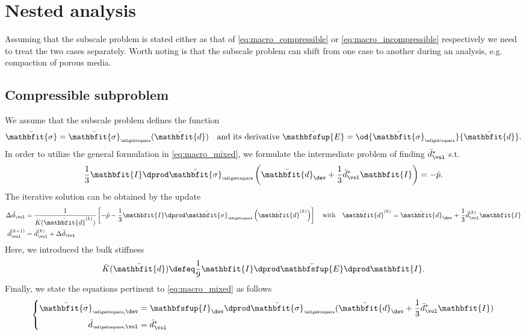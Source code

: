 \documentclass[a4paper,11pt]{article}
\renewcommand{\ts}[1]{\mathbfit{#1}}
\renewcommand{\tf}[1]{\mathbfsfup{#1}}
\renewcommand{\Box}{{\scalebox{0.5}{\mdlgwhtsquare}}}
\begin{document}
\section{Nested analysis}  \label{sec:nested}
Assuming that the subscale problem is stated either as that of \eqref{eq:macro_compressible} or \eqref{eq:macro_incompressible} respectively we need to treat the two cases separately.
Worth noting is that the subscale problem can shift from one case to another during an analysis, e.g. compaction of porous media.
\subsection{Compressible subproblem} \label{sec:nested_compressible}
We assume that the subscale problem defines the function 
\begin{align}
 \bar{\ts\sigma} = \bar{\ts\sigma}_\Box(\bar{\ts d})\quad \text{and its derivative } \bar{\tf E} = \od{\bar{\ts\sigma}_\Box}{\bar{\ts d}}.
\end{align}
In order to utilize the general formulation in \eqref{eq:macro_mixed}, we formulate the intermediate problem of finding $\bar{d}_\vol^*$ s.t.
\begin{align}
 \frac13 \ts I\dprod \bar{\ts\sigma}_\Box\left(\bar{\ts d}_\dev + \frac13 \bar{d}_\vol^* \ts I\right) = -\bar p.
\end{align}
The iterative solution can be obtained by the update
\begin{align}
 \Delta\bar{d}_\vol &= \frac{1}{\bar K(\bar{\ts d}^{(k)})} \left[-\bar p - \frac13 \ts I\dprod \bar{\ts\sigma}_\Box\left(\bar{\ts d}^{(k)}\right)\right] \quad \text{with}\quad \bar{\ts d}^{(k)} = \bar{\ts d}_\dev + \frac13 \bar{d}_\vol^{(k)} \ts I\\
 \bar{d}_\vol^{(k+1)} &= \bar{d}_\vol^{(k)} + \Delta\bar{d}_\vol
\end{align}
Here, we introduced the bulk stiffness
\begin{align}
  \bar K(\bar{\ts d}) \defeq \frac19  \ts I\dprod \bar{\tf E} \dprod \ts I.
\end{align}
Finally, we state the equations pertinent to \eqref{eq:macro_mixed} as follows
\begin{align}
 \left\{ \begin{aligned}
         \bar{\ts\sigma}_{\Box,\dev} &= \tf I_\dev \dprod \bar{\ts\sigma}_\Box(\bar{\ts d}_\dev + \frac13 \bar{d}_\vol^* \ts I)\\
         \bar{d}_{\Box,\vol} &= \bar{d}_\vol^*
        \end{aligned}
 \right.
\end{align}
\end{document}
